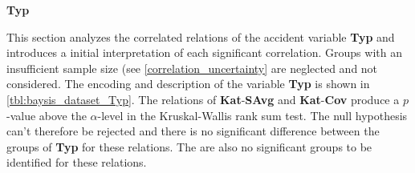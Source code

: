 \Large
\centerline{\textbf{Typ}}
\normalsize
This section analyzes the correlated relations of the accident variable \textbf{Typ} and introduces a initial interpretation of each significant correlation. Groups with an insufficient sample size (see \cref{correlation_uncertainty} are neglected and not considered. The encoding and description of the variable \textbf{Typ} is shown in \cref{tbl:baysis_dataset_Typ}. The relations of \textbf{Kat}-\textbf{SAvg} and 
\textbf{Kat}-\textbf{Cov} produce a $p$-value above the $\alpha$-level in the Kruskal-Wallis rank sum test. The null hypothesis can't therefore be rejected and there is no significant difference between the groups of \textbf{Typ} for these relations. The are also no significant groups to be identified for these relations.

